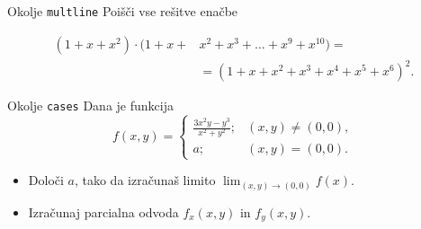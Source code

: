 \begin{frame}{Okolje \texttt{multline}}
	Poišči vse rešitve enačbe
	
	
	\begin{align*}
		(1+x+x^2) \cdot (1+x+&x^2+x^3+\ldots+x^9+x^{10}) = \\
		&=(1+x+x^2+x^3+x^4+x^5+x^6)^2.
	\end{align*}
	
\end{frame}

\begin{frame}{Okolje \texttt{cases}}
	Dana je funkcija
	$$
		f(x,y)= \begin{cases}
			\frac{3x^2y-y^3}{x^2+y^2}; &(x,y)\neq (0,0),\\
			a; &(x,y)=(0,0).
		\end{cases}
	$$	
	\begin{itemize}
	\item Določi $a$, tako da izračunaš limito \( \lim_{(x,y)\to(0,0)} f(x). \)
	\item Izračunaj parcialna odvoda $f_x(x,y)$ in $f_y(x,y)$.
	\end{itemize}
\end{frame}
